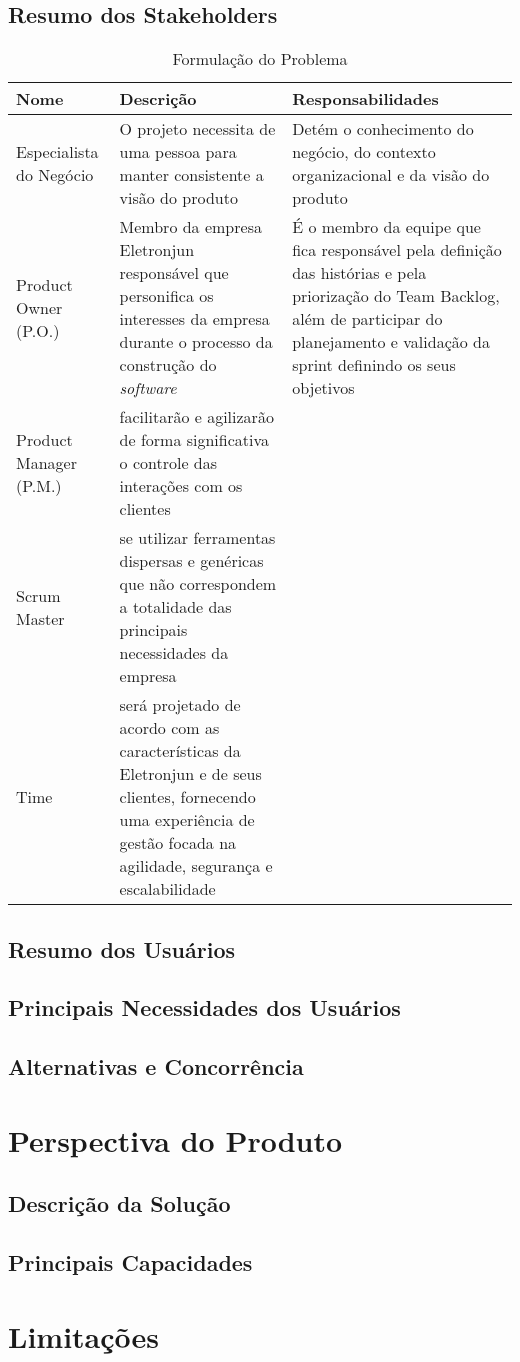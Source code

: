     \subsection{Resumo dos Stakeholders}
      \begin{table}[!htbp]
        \centering
        \caption{Formulação do Problema}
        \label{Formulação Do Problema}
        \begin{tabularx}{0.9\textwidth}{|s|s|t|}
          \hline
            \textbf{Nome}             &     \textbf{Descrição}     &   \textbf{Responsabilidades} \\ \hline
            Especialista do Negócio   & O projeto necessita de uma pessoa para manter consistente a visão do produto & Detém o conhecimento do negócio, do contexto organizacional e da visão do produto  \\ \hline
            Product Owner (P.O.)      & Membro da empresa Eletronjun responsável que personifica os interesses da empresa durante o processo da construção do \textit{software} & É o membro da equipe que fica responsável pela definição das histórias e pela priorização do Team Backlog, além de participar do planejamento e validação da sprint definindo os seus objetivos   \\ \hline
            Product Manager (P.M.)    & facilitarão e agilizarão de forma significativa o controle das interações com os clientes   \\ \hline
            Scrum Master              & se utilizar ferramentas dispersas e genéricas que não correspondem a totalidade das principais necessidades da empresa   \\ \hline
            Time                      & será projetado de acordo com as características da Eletronjun e de seus clientes, fornecendo uma experiência de gestão focada na agilidade, segurança e escalabilidade    \\ \hline
        \end{tabularx}
      \end{table}
    \subsection{Resumo dos Usuários}
    \subsection{Principais Necessidades dos Usuários}
    \subsection{Alternativas e Concorrência}
  \section{Perspectiva do Produto}
    \subsection{Descrição da Solução}
    \subsection{Principais Capacidades}
  \section{Limitações} 
